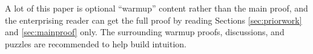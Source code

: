 \documentclass{article}\usepackage[a4paper,margin=20mm]{geometry}
\begin{document}
A lot of this paper is optional ``warmup'' content rather than the main proof, and the enterprising reader can get the full proof by reading Sections \ref{sec:priorwork} and \ref{sec:mainproof} only.
The surrounding warmup proofs, discussions, and puzzles are recommended to help build intuition.










\end{document}
